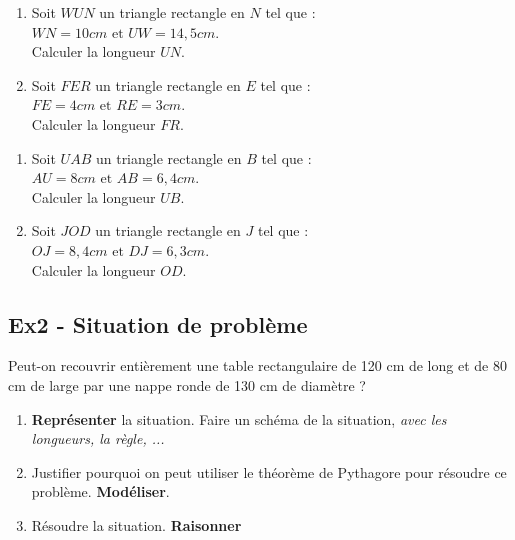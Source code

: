 \documentclass[12pt]{article}
\begin{document}
\begin{multicols}{2}
  \begin{enumerate}
  \item[3.] Soit $WUN$ un triangle rectangle en $N$ tel que :\\
    $WN=10cm \text{ et }UW=14,5cm$.\\
    Calculer la longueur $UN$.
    \columnbreak
  \item[4.] Soit $FER$ un triangle rectangle en $E$ tel que :\\
    $FE=4cm \text{ et }RE=3cm$.\\
    Calculer la longueur $FR$.
  \end{enumerate}
\end{multicols}


\begin{multicols}{2}
  \begin{enumerate}
  \item[5.] Soit $UAB$ un triangle rectangle en $B$ tel que :\\
    $AU=8cm \text{ et }AB=6,4cm$.\\
    Calculer la longueur $UB$.
    \columnbreak
  \item[6.] Soit $JOD$ un triangle rectangle en $J$ tel que :\\
    $OJ=8,4cm \text{ et }DJ=6,3cm$.\\
    Calculer la longueur $OD$.
  \end{enumerate}
\end{multicols}

\subsection*{Ex2 - Situation de problème}

Peut-on recouvrir entièrement une table rectangulaire de 120 cm de long et de 80 cm de large par une nappe ronde de 130 cm de diamètre ?

\begin{enumerate}
\item[1.] \textbf{Représenter} la situation. Faire un schéma de la situation, \textit{avec les longueurs, la règle, ...}
\item[2.] Justifier pourquoi on peut utiliser le théorème de Pythagore pour résoudre ce problème. \textbf{Modéliser}. 
\item[3.] Résoudre la situation. \textbf{Raisonner}
\end{enumerate}
\end{document}
